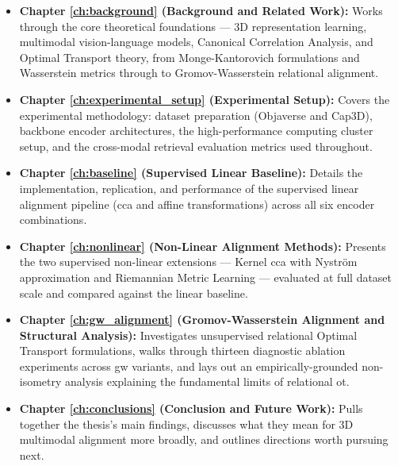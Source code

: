 \begin{itemize}
    \item \textbf{Chapter \ref{ch:background} (Background and Related Work):}
    Works through the core theoretical foundations --- 3D representation learning,
    multimodal vision-language models, Canonical Correlation Analysis, and
    Optimal Transport theory, from Monge-Kantorovich formulations and
    Wasserstein metrics through to Gromov-Wasserstein relational alignment.

    \item \textbf{Chapter \ref{ch:experimental_setup} (Experimental Setup):}
    Covers the experimental methodology: dataset preparation (Objaverse and
    Cap3D), backbone encoder architectures, the high-performance computing cluster
    setup, and the cross-modal retrieval evaluation metrics used throughout.

    \item \textbf{Chapter \ref{ch:baseline} (Supervised Linear Baseline):}
    Details the implementation, replication, and performance of the supervised
    linear alignment pipeline (\gls{cca} and affine transformations) across all six
    encoder combinations.

    \item \textbf{Chapter \ref{ch:nonlinear} (Non-Linear Alignment Methods):}
    Presents the two supervised non-linear extensions --- Kernel \gls{cca} with
    Nystr\"{o}m approximation and Riemannian Metric Learning --- evaluated at
    full dataset scale and compared against the linear baseline.

    \item \textbf{Chapter \ref{ch:gw_alignment} (Gromov-Wasserstein Alignment
    and Structural Analysis):} Investigates unsupervised relational Optimal
    Transport formulations, walks through thirteen diagnostic ablation experiments
    across \gls{gw} variants, and lays out an empirically-grounded non-isometry
    analysis explaining the fundamental limits of relational \gls{ot}.

    \item \textbf{Chapter \ref{ch:conclusions} (Conclusion and Future Work):}
    Pulls together the thesis's main findings, discusses what they mean for 3D
    multimodal alignment more broadly, and outlines directions worth pursuing
    next.
\end{itemize}